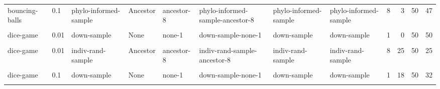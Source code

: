 \documentclass[
]{book}
\begin{document}
\begin{table}
\begin{tabular}{l|l|l|l|l|l|l|l|l|r|r|r}
\hline
\cellcolor{gray!6}{bouncing-balls} & \cellcolor{gray!6}{0.1} & \cellcolor{gray!6}{indiv-rand-sample} & \cellcolor{gray!6}{Ancestor} & \cellcolor{gray!6}{ancestor-8} & \cellcolor{gray!6}{indiv-rand-sample-ancestor-8} & \cellcolor{gray!6}{indiv-rand-sample} & \cellcolor{gray!6}{indiv-rand-sample} & \cellcolor{gray!6}{8} & \cellcolor{gray!6}{2} & \cellcolor{gray!6}{50} & \cellcolor{gray!6}{48}\\
\hline
bouncing-balls & 0.1 & phylo-informed-sample & Ancestor & ancestor-8 & phylo-informed-sample-ancestor-8 & phylo-informed-sample & phylo-informed-sample & 8 & 3 & 50 & 47\\
\hline
\cellcolor{gray!6}{bouncing-balls} & \cellcolor{gray!6}{1} & \cellcolor{gray!6}{full} & \cellcolor{gray!6}{None} & \cellcolor{gray!6}{none-1} & \cellcolor{gray!6}{full-none-1} & \cellcolor{gray!6}{full} & \cellcolor{gray!6}{full} & \cellcolor{gray!6}{1} & \cellcolor{gray!6}{0} & \cellcolor{gray!6}{100} & \cellcolor{gray!6}{100}\\
\hline
dice-game & 0.01 & down-sample & None & none-1 & down-sample-none-1 & down-sample & down-sample & 1 & 0 & 50 & 50\\
\hline
\cellcolor{gray!6}{dice-game} & \cellcolor{gray!6}{0.01} & \cellcolor{gray!6}{down-sample} & \cellcolor{gray!6}{Ancestor} & \cellcolor{gray!6}{ancestor-8} & \cellcolor{gray!6}{down-sample-ancestor-8} & \cellcolor{gray!6}{down-sample} & \cellcolor{gray!6}{down-sample-ancestor} & \cellcolor{gray!6}{8} & \cellcolor{gray!6}{26} & \cellcolor{gray!6}{50} & \cellcolor{gray!6}{24}\\
\hline
dice-game & 0.01 & indiv-rand-sample & Ancestor & ancestor-8 & indiv-rand-sample-ancestor-8 & indiv-rand-sample & indiv-rand-sample & 8 & 25 & 50 & 25\\
\hline
\cellcolor{gray!6}{dice-game} & \cellcolor{gray!6}{0.01} & \cellcolor{gray!6}{phylo-informed-sample} & \cellcolor{gray!6}{Ancestor} & \cellcolor{gray!6}{ancestor-8} & \cellcolor{gray!6}{phylo-informed-sample-ancestor-8} & \cellcolor{gray!6}{phylo-informed-sample} & \cellcolor{gray!6}{phylo-informed-sample} & \cellcolor{gray!6}{8} & \cellcolor{gray!6}{31} & \cellcolor{gray!6}{50} & \cellcolor{gray!6}{19}\\
\hline
dice-game & 0.1 & down-sample & None & none-1 & down-sample-none-1 & down-sample & down-sample & 1 & 18 & 50 & 32\\
\hline
\cellcolor{gray!6}{dice-game} & \cellcolor{gray!6}{0.1} & \cellcolor{gray!6}{down-sample} & \cellcolor{gray!6}{Ancestor} & \cellcolor{gray!6}{ancestor-8} & \cellcolor{gray!6}{down-sample-ancestor-8} & \cellcolor{gray!6}{down-sample} & \cellcolor{gray!6}{down-sample-ancestor} & \cellcolor{gray!6}{8} & \cellcolor{gray!6}{19} & \cellcolor{gray!6}{50} & \cellcolor{gray!6}{31}\\

\end{tabular}
\end{table}
\end{document}

